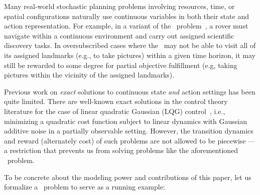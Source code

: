 \label{sec:intro}

Many real-world stochastic planning problems involving resources,
time, or spatial configurations naturally use continuous variables in
both their state and action representation.  For example, in a variant
of the
\MarsRover\ problem~\cite{bresina02}, a rover must navigate within a
continuous environment and carry out assigned scientific discovery
tasks.  In oversubscribed cases where the \MarsRover\ may not be able
to visit all of its assigned landmarks (e.g., to take pictures) within a
given time horizon, it may still be rewarded to some degree for
partial objective fulfillment (e.g, taking pictures within the
vicinity of the assigned landmarks).  

Previous work on \emph{exact} solutions to continuous state \emph{and}
action settings has been quite limited.  There are well-known exact
solutions in the control theory literature for the case of linear
quadratic Gaussian (LQG) control~\cite{lqgc}, i.e., minimizing a quadratic cost
function subject to linear dynamics with Gaussian additive noise in a
partially observable setting.  However, the transition dynamics and
reward (alternately cost) of such problems are not allowed to be
piecewise --- a restriction that prevents us from solving
problems like the aforementioned \MarsRover\ problem.

To be concrete about the modeling power and contributions of this 
paper, let us formalize a \MarsRover\ problem to serve as a
running example:

